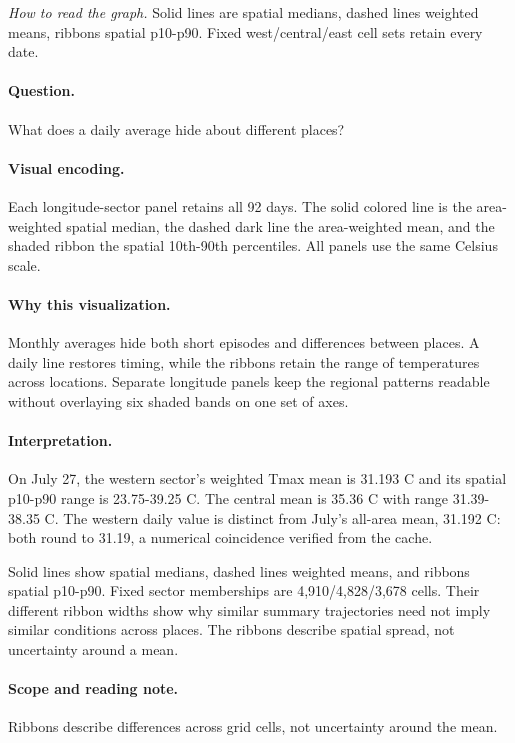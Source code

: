 \documentclass[conference,a4paper]{IEEEtran}
\begin{document}
\noindent\textit{How to read the graph.} Solid lines are spatial medians, dashed lines weighted means, ribbons spatial p10-p90. Fixed west/central/east cell sets retain every date.

\paragraph{Question.} What does a daily average hide about different places?



\paragraph{Visual encoding.} Each longitude-sector panel retains all 92 days. The solid colored line is the area-weighted spatial median, the dashed dark line the area-weighted mean, and the shaded ribbon the spatial 10th-90th percentiles. All panels use the same Celsius scale.



\paragraph{Why this visualization.} Monthly averages hide both short episodes and differences between places. A daily line restores timing, while the ribbons retain the range of temperatures across locations. Separate longitude panels keep the regional patterns readable without overlaying six shaded bands on one set of axes.



\paragraph{Interpretation.} On July 27, the western sector's weighted Tmax mean is 31.193 C and its spatial p10-p90 range is 23.75-39.25 C. The central mean is 35.36 C with range 31.39-38.35 C. The western daily value is distinct from July's all-area mean, 31.192 C: both round to 31.19, a numerical coincidence verified from the cache.

Solid lines show spatial medians, dashed lines weighted means, and ribbons spatial p10-p90. Fixed sector memberships are 4,910/4,828/3,678 cells. Their different ribbon widths show why similar summary trajectories need not imply similar conditions across places. The ribbons describe spatial spread, not uncertainty around a mean.



\paragraph{Scope and reading note.} Ribbons describe differences across grid cells, not uncertainty around the mean.
\end{document}
